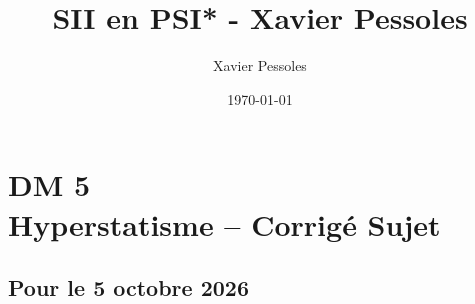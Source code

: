 \documentclass[
	fontsize=10pt, %
	twoside=false, %
]{kaobook}
\newcommand{\repRel}{../../../..}
\newcommand{\repStyle}{\repRel/Style}
\begin{document}

\titlehead{Document Template}
\title[SII en PSI* - Xavier Pessoles]{SII en PSI* - Xavier Pessoles}
\author[XP]{Xavier Pessoles}
\date{\today}

%
\frontmatter %


%
\mainmatter %


\setcounter{margintocdepth}{\sectiontocdepth}
\graphicspath{{\repStyle/png}}

\pagestyle{xp.scrheadings}



\newcommand{\repExo}{}
\newcommand{\nomExo}{}

\livrettrue %
\collefalse\colletrue
\normaltrue

\newcommand{\exer}{\subsection*}

\chapter*{DM 5 \\ 
Hyperstatisme  -- 
\ifprof Corrigé \else Sujet \fi}


\section*{Pour le 5 octobre 2026}

\renewcommand{\repExo}{\repRel/PSI_Cy_02_PredictionPerfomances/Chapitre_01_Stabilite/Cy_02_Ch_01_TD_01_Drone/}
\renewcommand{\nomExo}{Cy_02_Ch_01_DM_Drone.tex}
\end{document}
